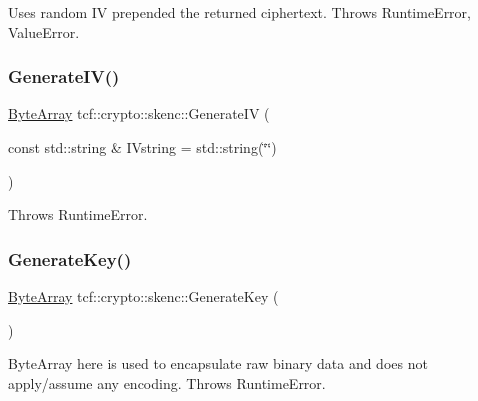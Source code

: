 Uses random IV prepended the returned ciphertext. Throws Runtime\+Error, Value\+Error. \mbox{\label{namespacetcf_1_1crypto_1_1skenc_a1e0203bf47c30fa78db18d32e7b8ec64}} 
\subsubsection{\texorpdfstring{Generate\+I\+V()}{GenerateIV()}}
{\footnotesize\ttfamily \hyperlink{types_8h_a35da937e2331acce98d47f44892f4a76}{Byte\+Array} tcf\+::crypto\+::skenc\+::\+Generate\+IV (\begin{DoxyParamCaption}\item[{const std\+::string \&}]{I\+Vstring = {\ttfamily std\+:\+:string(\char`\"{}\char`\"{})} }\end{DoxyParamCaption})}

Throws Runtime\+Error. \mbox{\label{namespacetcf_1_1crypto_1_1skenc_a3ef58796a0884661acd1b4655a9ca431}} 
\subsubsection{\texorpdfstring{Generate\+Key()}{GenerateKey()}}
{\footnotesize\ttfamily \hyperlink{types_8h_a35da937e2331acce98d47f44892f4a76}{Byte\+Array} tcf\+::crypto\+::skenc\+::\+Generate\+Key (\begin{DoxyParamCaption}{ }\end{DoxyParamCaption})}

Byte\+Array here is used to encapsulate raw binary data and does not apply/assume any encoding. Throws Runtime\+Error. 